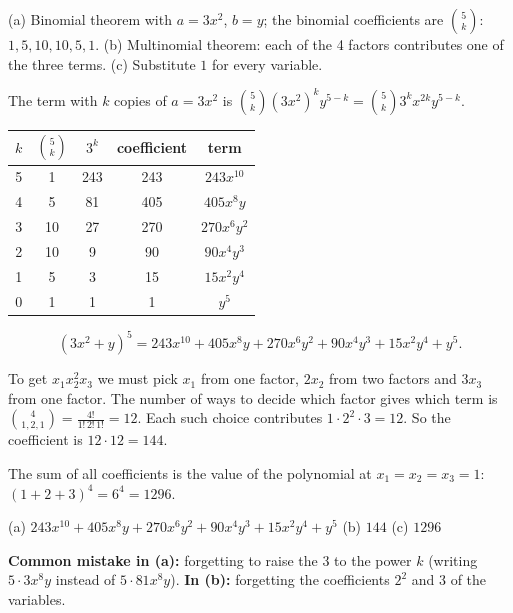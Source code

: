 \ifsolutions
	\soltitle
	\idea (a) Binomial theorem with $a=3x^2$, $b=y$; the binomial coefficients
	are $\binom5k$: $1,5,10,10,5,1$. (b) Multinomial theorem: each of the 4
	factors contributes one of the three terms. (c) Substitute $1$ for every
	variable.

	 The term with $k$ copies of $a=3x^2$ is
	$\binom5k(3x^2)^ky^{5-k}=\binom5k3^kx^{2k}y^{5-k}$.
	\begin{center}
		\begin{tabular}{ccccc}
			\toprule $k$ & $\binom5k$ & $3^k$ & coefficient & term        \\\midrule
			5            & 1          & 243   & 243         & $243x^{10}$ \\
			4            & 5          & 81    & 405         & $405x^8y$   \\
			3            & 10         & 27    & 270         & $270x^6y^2$ \\
			2            & 10         & 9     & 90          & $90x^4y^3$  \\
			1            & 5          & 3     & 15          & $15x^2y^4$  \\
			0            & 1          & 1     & 1           & $y^5$       \\\bottomrule
		\end{tabular}
	\end{center}
	\[ (3x^2+y)^5=243x^{10}+405x^8y+270x^6y^2+90x^4y^3+15x^2y^4+y^5. \]

	 To get $x_1x_2^2x_3$ we must pick $x_1$ from one factor, $2x_2$
	from two factors and $3x_3$ from one factor. The number of ways to decide
	which factor gives which term is $\binom{4}{1,2,1}=\frac{4!}{1!\,2!\,1!}=12$.
	Each such choice contributes $1\cdot2^2\cdot3=12$. So the coefficient is
	$12\cdot12=144$.

	 The sum of all coefficients is the value of the polynomial at
	$x_1=x_2=x_3=1$: $(1+2+3)^4=6^4=1296$.
	\begin{answer}
		(a) $243x^{10}+405x^8y+270x^6y^2+90x^4y^3+15x^2y^4+y^5$ \quad
		(b) $144$ \quad (c) $1296$
	\end{answer}
	\begin{remark}
		\textbf{Common mistake in (a):} forgetting to raise the $3$ to the power
		$k$ (writing $5\cdot3x^8y$ instead of $5\cdot81x^8y$). \textbf{In (b):}
		forgetting the coefficients $2^2$ and $3$ of the variables.
	\end{remark}
\fi

